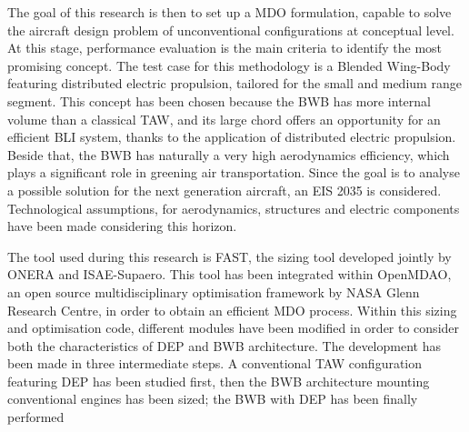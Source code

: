 The goal of this research is then to set up a MDO formulation, capable to solve the aircraft design problem of unconventional configurations at conceptual level. 
At this stage, performance evaluation is the main criteria to identify the most promising concept.
The test case for this methodology is a Blended Wing-Body featuring distributed electric propulsion, tailored for the small and medium range segment. 
This concept has been chosen because the BWB has more internal volume than a classical TAW, and its large chord offers an opportunity for an efficient BLI system, thanks to the application of distributed electric propulsion. 
Beside that, the BWB has naturally a very high aerodynamics efficiency, which plays a significant role in greening air transportation. 
Since the goal is to analyse a possible solution for the next generation aircraft, an EIS 2035 is considered. 
Technological assumptions, for aerodynamics, structures and electric components have been made considering this horizon. 

The tool used during this research is FAST, the sizing tool developed jointly by ONERA and ISAE-Supaero. 
This tool has been integrated within OpenMDAO, an open source multidisciplinary optimisation framework by NASA Glenn Research Centre, in order to obtain an efficient MDO process. 
Within this sizing and optimisation code, different modules have been modified in order to consider both the characteristics of DEP and BWB architecture.
The development has been made in three intermediate steps.
A conventional TAW configuration featuring DEP has been studied first, then the BWB architecture mounting conventional engines has been sized; the BWB with DEP has been finally performed

